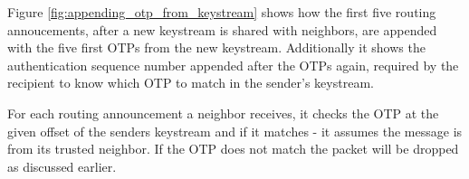 Figure \ref{fig:appending_otp_from_keystream} shows how the first five routing
annoucements, after a new keystream is shared with neighbors, are appended with
the five first \acp{OTP} from the new keystream. Additionally it shows the
authentication sequence number appended after the \acp{OTP} again, required by
the recipient to know which OTP to match in the sender's keystream.

For each routing announcement a neighbor receives, it checks the \ac{OTP} at the
given offset of the senders keystream and if it matches - it assumes the message
is from its trusted neighbor. If the \ac{OTP} does not match the packet will be
dropped as discussed earlier.


